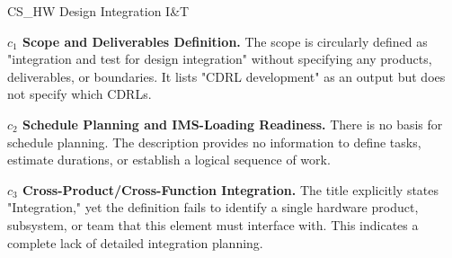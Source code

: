%
\begin{frame}{CS\_HW Design Integration I\&T}
\begin{minipage}{0.90\textwidth}
\raggedright
\fontsize{8}{9.5}\selectfont
\textbf{\(c_1\) Scope and Deliverables Definition.}
The scope is circularly defined as "integration and test for design integration" without specifying any products, deliverables, or boundaries. It lists "CDRL development" as an output but does not specify which CDRLs.\par\vspace{0.6em}
\textbf{\(c_2\) Schedule Planning and IMS-Loading Readiness.}
There is no basis for schedule planning. The description provides no information to define tasks, estimate durations, or establish a logical sequence of work.\par\vspace{0.6em}
\textbf{\(c_3\) Cross-Product/Cross-Function Integration.}
The title explicitly states "Integration," yet the definition fails to identify a single hardware product, subsystem, or team that this element must interface with. This indicates a complete lack of detailed integration planning.\par\vspace{0.6em}
\end{minipage}
\end{frame}

\endinput
